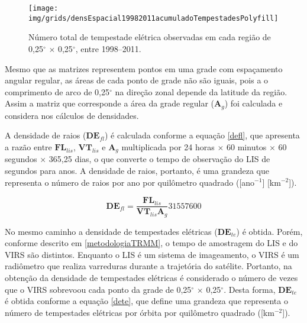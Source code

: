 \begin{figure}[!ht]
  \centering 
  {{\texttt{[image: img/grids/densEspacial19982011acumuladoTempestadesPolyfill]}}}
\caption{Número  total de tempestade elétrica observadas em cada região de 0,25$^{\circ}$  $\times$ 0,25$^{\circ}$,  entre 1998--2011.}
\label{taxaTotalTe}
\end{figure} 

Mesmo que as matrizes representem pontos em uma grade com espaçamento angular regular, as áreas de cada ponto de grade não são iguais, pois a  o comprimento de arco de 0,25$^{\circ}$ na direção zonal depende da latitude da região. Assim a matriz que corresponde a área da grade regular ($\mathbf{A}_g$) foi calculada e considera nos cálculos de densidades.


A densidade de raios ($\mathbf{DE}_{fl}$) é calculada conforme a equação \ref{defl}, que apresenta a razão entre $\mathbf{FL}_{lis}$, $\mathbf{VT}_{lis}$ e $\mathbf{A}_g$ multiplicada por 24 horas $\times$ 60 minutos $\times$ 60 segundos $\times$ 365,25 dias, o que converte o tempo de observação do LIS de segundos para anos. A densidade de raios, portanto, é uma grandeza que representa o número de raios por ano por quilômetro quadrado ([ano$^{-1}$] [km$^{-2}$]).

\begin{equation}
\mathbf{DE}_{fl} = \frac{\mathbf{FL}_{lis}}{\mathbf{VT}_{lis} \mathbf{A}_g} 31557600     
\label{defl}
\end{equation}

No mesmo caminho a densidade de tempestades elétricas ($\mathbf{DE}_{te}$) é obtida. Porém, conforme descrito em \ref{metodologiaTRMM}, o tempo de amostragem do LIS e do VIRS são distintos. Enquanto o LIS é um sistema de imageamento, o VIRS é um radiômetro que realiza varreduras durante a trajetória do satélite. Portanto, na obtenção da densidade de tempestades elétricas é considerado o número de vezes que o VIRS sobrevoou cada ponto da grade de 0,25$^{\circ}$  $\times$ 0,25$^{\circ}$. Desta forma, $\mathbf{DE}_{te}$ é obtida conforme a equação \ref{dete}, que define uma grandeza que representa o número de tempestades elétricas por órbita por quilômetro quadrado ([km$^{-2}$]).

